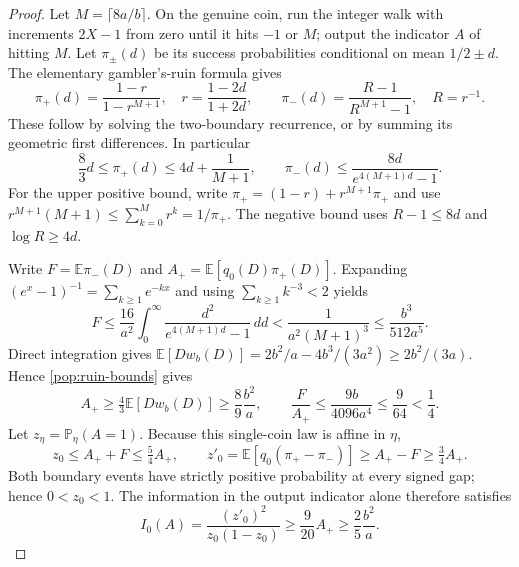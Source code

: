 \begin{proof}
Let $M=\lceil8a/b\rceil$. On the genuine coin, run the integer walk
with increments $2X-1$ from zero until it hits $-1$ or $M$; output the
indicator $A$ of hitting $M$. Let $\pi_\pm(d)$ be its success probabilities
conditional on mean $1/2\pm d$. The elementary gambler's-ruin formula gives
\[
 \pi_+(d)=\frac{1-r}{1-r^{M+1}},\quad
 r=\frac{1-2d}{1+2d},\qquad
 \pi_-(d)=\frac{R-1}{R^{M+1}-1},\quad R=r^{-1}.
\]
These follow by solving the two-boundary recurrence, or by summing its
geometric first differences. In particular
\begin{equation}\label{pop:ruin-bounds}
 \frac83d\le\pi_+(d)\le4d+\frac1{M+1},\qquad
 \pi_-(d)\le\frac{8d}{e^{4(M+1)d}-1}.
\end{equation}
For the upper positive bound, write
$\pi_+=(1-r)+r^{M+1}\pi_+$ and use
$r^{M+1}(M+1)\le\sum_{k=0}^M r^k=1/\pi_+$.
The negative bound uses $R-1\le8d$ and $\log R\ge4d$.

Write $F=\mathbb E\pi_-(D)$ and
$A_+=\mathbb E[q_0(D)\pi_+(D)]$. Expanding
$(e^x-1)^{-1}=\sum_{k\ge1}e^{-kx}$ and using
$\sum_{k\ge1}k^{-3}<2$ yields
\[
 F\le\frac{16}{a^2}\int_0^\infty
           \frac{d^2}{e^{4(M+1)d}-1}\,dd
 <\frac1{a^2(M+1)^3}
 \le\frac{b^3}{512a^5}.
\]
Direct integration gives
$\mathbb E[D w_b(D)]=2b^2/a-4b^3/(3a^2)\ge2b^2/(3a)$.
Hence \eqref{pop:ruin-bounds} gives
\[
 A_+\ge\tfrac43\mathbb E[D w_b(D)]\ge\frac89\frac{b^2}{a},
 \qquad \frac F{A_+}\le\frac{9b}{4096a^4}
 \le\frac9{64}<\frac14.
\]
Let $z_\eta=\mathbb P_\eta(A=1)$. Because this single-coin law is affine
in $\eta$,
\[
 z_0\le A_++F\le\tfrac54 A_+,\qquad
 z'_0=\mathbb E[q_0(\pi_+-\pi_-)]\ge A_+-F\ge\tfrac34 A_+.
\]
Both boundary events have strictly positive probability at every signed
gap; hence $0<z_0<1$.
The information in the output indicator alone therefore satisfies
\begin{equation}\label{pop:radial-I}
 I_0(A)=\frac{(z'_0)^2}{z_0(1-z_0)}
 \ge\frac9{20}A_+\ge\frac25\frac{b^2}{a}.
\end{equation}


\end{proof}
